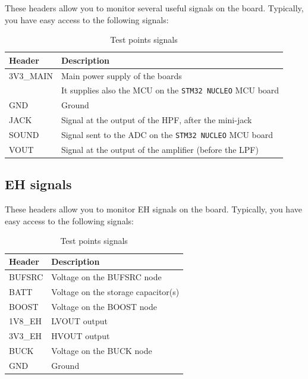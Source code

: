 These headers allow you to monitor several useful signals on the board. Typically, you have easy access to the following signals:

\begin{table}[h!]
    \centering
    \begin{tabular}{l l }
         \textbf{Header} & \textbf{Description} \\
         \toprule
         3V3\_MAIN & Main power supply of the boards \\
                   & It supplies also the MCU on the \texttt{STM32 NUCLEO} MCU board  \\
         GND & Ground \\
         JACK & Signal at the output of the HPF, after the mini-jack \\
         SOUND & Signal sent to the ADC on the \texttt{STM32 NUCLEO} MCU board \\
         VOUT & Signal at the output of the amplifier (before the LPF) \\
    \end{tabular}
    \caption{Test points signals}
    \label{tab:TP-signals}
\end{table}

\subsection{EH signals}

These headers allow you to monitor EH signals on the board. Typically, you have easy access to the following signals:

\begin{table}[h!]
    \centering
    \begin{tabular}{l l }
         \textbf{Header} & \textbf{Description} \\
         \toprule
         BUFSRC & Voltage on the BUFSRC node \\
         BATT & Voltage on the storage capacitor(s) \\
         BOOST & Voltage on the BOOST node \\
         1V8\_EH & LVOUT output \\
         3V3\_EH & HVOUT output \\
         BUCK & Voltage on the BUCK node \\
         GND & Ground
    \end{tabular}
    \caption{Test points signals}
    \label{tab:TP-signals}
\end{table}

